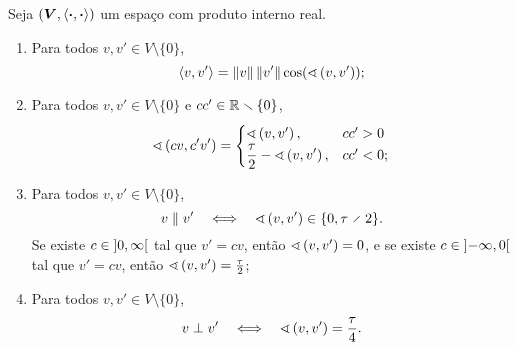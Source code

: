 \begin{proposition}
Seja $(\bm V,\left\langle{\bm{\cdot}},{\bm{\cdot}}\right\rangle)$ um espaço com produto interno real.
	\begin{enumerate}
	\item Para todos $v,v' \in V \setminus \{0\}$,
		\begin{equation*}
		\left\langle{v},{v'}\right\rangle = \left\Vert{v}\right\Vert\left\Vert{v'}\right\Vert\cos(\sphericalangle\left({v},{v'}\right));
		\end{equation*}
	\item Para todos $v,v' \in V \setminus \{0\}$ e $cc' \in \mathbb{R} \smallsetminus \{0\}$,
	\begin{equation*}
	\sphericalangle\left({cv},{c'v'}\right) = \begin{cases}
		\sphericalangle\left({v},{v'}\right),& cc'>0 \\
		\displaystyle\frac{\tau}{2} - \sphericalangle\left({v},{v'}\right),& cc'<0;
	\end{cases}
	\end{equation*}
	
	\item Para todos $v,v' \in V \setminus \{0\}$,
	\begin{equation*}
	v \parallel v' \sse \ang{v}{v'} \in \{0,\tau \div 2\}.
	\end{equation*}
Se existe $c \in \left]{0},{\infty}\right[$ tal que $v' =cv$, então $\sphericalangle\left({v},{v'}\right) = 0$, e se existe $c \in \left]{-\infty},{0}\right[$ tal que $v' =cv$, então $\sphericalangle\left({v},{v'}\right) = \frac{\tau}{2}$;
	
	\item Para todos $v,v' \in V \setminus \{0\}$,
	\begin{equation*}
	v \perp  v' \quad \Longleftrightarrow \quad \sphericalangle\left({v},{v'}\right) = \frac{\tau}{4}.
	\end{equation*}
	\end{enumerate}
\end{proposition}
